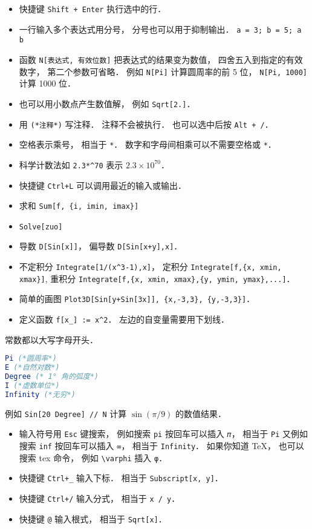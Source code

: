 
\begin{issues}
\issueDraft
\end{issues}


\begin{itemize}
\item 快捷键 \verb|Shift + Enter| 执行选中的行．
\item 一行输入多个表达式用分号， 分号也可以用于抑制输出． \verb|a = 3; b = 5; a b|
\item 函数 \verb|N[表达式, 有效位数]| 把表达式的结果变为数值， 四舍五入到指定的有效数字， 第二个参数可省略． 例如 \verb|N[Pi]| 计算圆周率的前 5 位， \verb|N[Pi, 1000]| 计算 1000 位．
\item 也可以用小数点产生数值解， 例如 \verb|Sqrt[2.]|．
\item 用 \verb|(*注释*)| 写注释． 注释不会被执行． 也可以选中后按 \verb|Alt + /|．
\item 空格表示乘号， 相当于 \verb|*|． 数字和字母间相乘可以不需要空格或 \verb|*|．
\item 科学计数法如 \verb|2.3*^70| 表示 $2.3\times 10^{70}$．
\item 快捷键 \verb|Ctrl+L| 可以调用最近的输入或输出．
\item 求和 \verb|Sum[f, {i, imin, imax}]|
\item \verb|Solve[zuo]|
\item 导数 \verb|D[Sin[x]]|， 偏导数 \verb|D[Sin[x+y],x]|．
\item 不定积分 \verb|Integrate[1/(x^3-1),x]|， 定积分 \verb|Integrate[f,{x, xmin, xmax}]|, 重积分 \verb|Integrate[f,{x, xmin, xmax},{y, ymin, ymax},...]|．
\item 简单的画图 \verb|Plot3D[Sin[y+Sin[3x]], {x,-3,3}, {y,-3,3}]|．
\item 定义函数 \verb|f[x_] := x^2|． 左边的自变量需要用下划线．
\end{itemize}

常数都以大写字母开头．
\begin{lstlisting}[language=Mathematica]
Pi (*圆周率*)
E (*自然对数*)
Degree (* 1° 角的弧度*)
I (*虚数单位*)
Infinity (*无穷*)
\end{lstlisting}
例如 \verb|Sin[20 Degree] // N| 计算 $\sin(\pi/9)$ 的数值结果．

\begin{itemize}
\item 输入符号用 \verb|Esc| 键搜索， 例如搜索 \verb|pi| 按回车可以插入 \verb|𝜋|， 相当于 \verb|Pi| 又例如搜索 \verb|inf| 按回车可以插入 \verb|∞|， 相当于 \verb|Infinity|． 如果你知道 TeX， 也可以搜索 tex 命令， 例如 \verb|\varphi| 插入 \verb|φ|．
\item 快捷键 \verb|Ctrl+_| 输入下标． 相当于 \verb|Subscript[x, y]|．
\item 快捷键 \verb|Ctrl+/| 输入分式， 相当于 \verb|x / y|．
\item 快捷键 \verb|@| 输入根式， 相当于 \verb|Sqrt[x]|．
\end{itemize}

